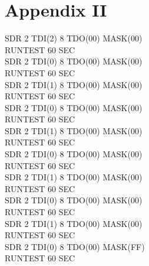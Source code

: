 \documentclass[a4paper,11pt]{article}
\begin{document}
\section*{Appendix II}
SDR 2 TDI(2) 8 TDO(00) MASK(00)\\
RUNTEST 60 SEC\\
SDR 2 TDI(0) 8 TDO(00) MASK(00)\\
RUNTEST 60 SEC\\
SDR 2 TDI(1) 8 TDO(00) MASK(00)\\
RUNTEST 60 SEC\\
SDR 2 TDI(0) 8 TDO(00) MASK(00)\\
RUNTEST 60 SEC\\
SDR 2 TDI(1) 8 TDO(00) MASK(00)\\
RUNTEST 60 SEC\\
SDR 2 TDI(0) 8 TDO(00) MASK(00)\\
RUNTEST 60 SEC\\
SDR 2 TDI(1) 8 TDO(00) MASK(00)\\
RUNTEST 60 SEC\\
SDR 2 TDI(0) 8 TDO(00) MASK(00)\\
RUNTEST 60 SEC\\
SDR 2 TDI(1) 8 TDO(00) MASK(00)\\
RUNTEST 60 SEC\\
SDR 2 TDI(0) 8 TDO(00) MASK(FF)\\
RUNTEST 60 SEC\\
\end{document}
